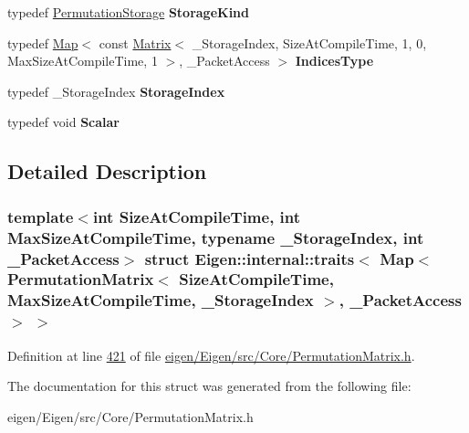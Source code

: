 \begin{DoxyCompactItemize}
typedef \hyperlink{struct_eigen_1_1_permutation_storage}{Permutation\+Storage} {\bfseries Storage\+Kind}
\item 
\mbox{\label{struct_eigen_1_1internal_1_1traits_3_01_map_3_01_permutation_matrix_3_01_size_at_compile_time_0013e0044a37b24d59a079ebbe4c707a56_a6fb19f74cd0deba060753a58b3242745}} 
typedef \hyperlink{group___core___module_class_eigen_1_1_map}{Map}$<$ const \hyperlink{group___core___module_class_eigen_1_1_matrix}{Matrix}$<$ \+\_\+\+Storage\+Index, Size\+At\+Compile\+Time, 1, 0, Max\+Size\+At\+Compile\+Time, 1 $>$, \+\_\+\+Packet\+Access $>$ {\bfseries Indices\+Type}
\item 
\mbox{\label{struct_eigen_1_1internal_1_1traits_3_01_map_3_01_permutation_matrix_3_01_size_at_compile_time_0013e0044a37b24d59a079ebbe4c707a56_a32734b88c67df51aa9130d105243a279}} 
typedef \+\_\+\+Storage\+Index {\bfseries Storage\+Index}
\item 
\mbox{\label{struct_eigen_1_1internal_1_1traits_3_01_map_3_01_permutation_matrix_3_01_size_at_compile_time_0013e0044a37b24d59a079ebbe4c707a56_a3ddbd03c8a8cce2eaa370bdb38fe2b84}} 
typedef void {\bfseries Scalar}
\end{DoxyCompactItemize}


\subsection{Detailed Description}
\subsubsection*{template$<$int Size\+At\+Compile\+Time, int Max\+Size\+At\+Compile\+Time, typename \+\_\+\+Storage\+Index, int \+\_\+\+Packet\+Access$>$\newline
struct Eigen\+::internal\+::traits$<$ Map$<$ Permutation\+Matrix$<$ Size\+At\+Compile\+Time, Max\+Size\+At\+Compile\+Time, \+\_\+\+Storage\+Index $>$, \+\_\+\+Packet\+Access $>$ $>$}



Definition at line \hyperlink{eigen_2_eigen_2src_2_core_2_permutation_matrix_8h_source_l00421}{421} of file \hyperlink{eigen_2_eigen_2src_2_core_2_permutation_matrix_8h_source}{eigen/\+Eigen/src/\+Core/\+Permutation\+Matrix.\+h}.



The documentation for this struct was generated from the following file\+:\begin{DoxyCompactItemize}
\item 
eigen/\+Eigen/src/\+Core/\+Permutation\+Matrix.\+h\end{DoxyCompactItemize}
